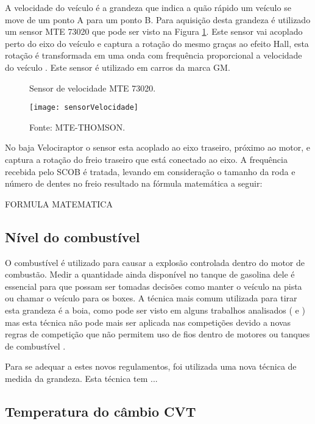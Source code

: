 A velocidade do veículo é a grandeza que indica a quão rápido um veículo se move de um ponto A para um ponto B. Para aquisição desta grandeza é utilizado um sensor MTE 73020 que pode ser visto na Figura \ref{fig:sensorVelocidade}. Este sensor vai acoplado perto do eixo do veículo e captura a rotação do mesmo graças ao efeito Hall, esta rotação é transformada em uma onda com frequência proporcional a velocidade do veículo \cite{MTEsensorVelocidade}. Este sensor é utilizado em carros da marca GM.  

\begin{figure}[!htb]
	\centering
		\caption{Sensor de velocidade MTE 73020.}
		\texttt{[image: sensorVelocidade]} 
		\caption*{Fonte: MTE-THOMSON.}
		\label{fig:sensorVelocidade}
\end{figure} 

No baja Velociraptor o sensor esta acoplado ao eixo traseiro, próximo ao motor, e captura a rotação do freio traseiro que está conectado ao eixo. A frequência recebida pelo SCOB é tratada, levando em consideração o tamanho da roda e número de dentes no freio resultado na fórmula matemática a seguir:

FORMULA MATEMATICA



\subsection{Nível do combustível}
\label{subsec:combustivel}

O combustível é utilizado para causar a explosão controlada dentro do motor de combustão. Medir a quantidade ainda disponível no tanque de gasolina dele é essencial para que possam ser tomadas decisões como manter o veículo na pista ou chamar o veículo para os boxes. A técnica mais comum utilizada para tirar esta grandeza é a boia, como pode ser visto em alguns trabalhos analisados (\cite{Nunes2016} e \cite{projetoMiniBaja2006}) mas esta técnica não pode mais ser aplicada nas competições devido a novas regras de competição que não permitem uso de fios dentro de motores ou tanques de combustível \cite{regulamentobajasae}. 

Para se adequar a estes novos regulamentos, foi utilizada uma nova técnica de medida da grandeza. Esta técnica tem ...

\subsection{Temperatura do câmbio CVT}

